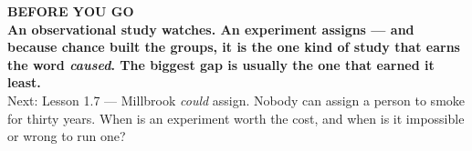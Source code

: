 \documentclass[aspectratio=169, 11pt]{beamer}
\begin{document}
{
\begin{frame}[plain]
  \vspace{1.5cm}\hspace{0.8cm}%
  \begin{minipage}{0.86\textwidth}
    {\color{goldacc}\bfseries\small BEFORE YOU GO}\\[0.7cm]
    {\color{white}\bfseries\Large An observational study watches. An experiment assigns --- and
    because chance built the groups, it is the one kind of study that earns the word
    \emph{caused}. The biggest gap is usually the one that earned it least.}\\[0.9cm]
    {\color{frostmid}\small Next: Lesson 1.7 --- Millbrook \emph{could} assign. Nobody can
    assign a person to smoke for thirty years. When is an experiment worth the cost, and when
    is it impossible or wrong to run one?}
  \end{minipage}
\end{frame}
}
\end{document}
